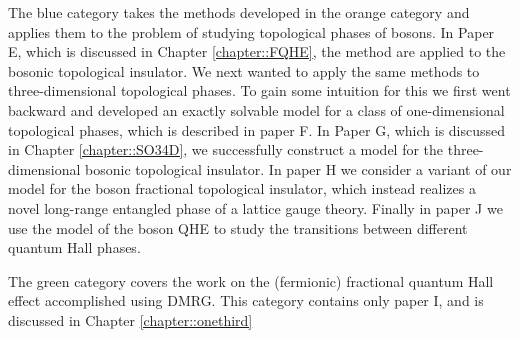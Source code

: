 The blue category takes the methods developed in the orange category and applies them to the problem of studying topological phases of bosons. In Paper E, which is discussed in Chapter \ref{chapter::FQHE}, the method are applied to the bosonic topological insulator. We next wanted to apply the same methods to three-dimensional topological phases. To gain some intuition for this we first went backward and developed an exactly solvable model for a class of one-dimensional topological phases, which is described in paper F. In Paper G, which is discussed in Chapter \ref{chapter::SO34D}, we successfully construct a model for the three-dimensional bosonic topological insulator. In paper H we consider a variant of our model for the boson fractional topological insulator, which instead realizes a novel long-range entangled phase of a lattice gauge theory. Finally in paper J we use the model of the boson QHE to study the transitions between different quantum Hall phases.

The green category covers the work on the (fermionic) fractional quantum Hall effect accomplished using DMRG. This category contains only paper I, and is discussed in Chapter \ref{chapter::onethird}
